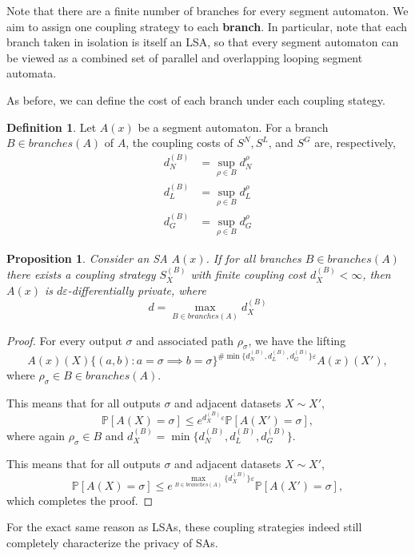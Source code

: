 \documentclass[12pt]{article}
\newcommand{\PP}{\mathbb{P}}
\newtheorem{prop}[thm]{Proposition}
\theoremstyle{definition}
\newtheorem{defn}[thm]{Definition}
\begin{document}
Note that there are a finite number of branches for every segment automaton. We aim to assign one coupling strategy to each \textbf{branch}. In particular, note that each branch taken in isolation is itself an LSA, so that every segment automaton can be viewed as a combined set of parallel and overlapping looping segment automata. 

As before, we can define the cost of each branch under each coupling stategy.

\begin{defn}
    Let $A(x)$ be a segment automaton. For a branch $B\in branches(A)$ of $A$, the coupling costs of $S^N, S^L$, and $S^G$ are, respectively,
    \begin{align*}
        d_N^{(B)} &= \sup_{\rho\in B} d_N^\rho\\
        d_L^{(B)} &= \sup_{\rho\in B} d_L^\rho\\
        d_G^{(B)} &= \sup_{\rho\in B} d_G^\rho
    \end{align*}
\end{defn}


\begin{prop}
    Consider an SA $A(x)$. If for all branches $B\in branches(A)$ there exists a coupling strategy $S_X^{(B)}$ with finite coupling cost $d_X^{(B)} <\infty$, then $A(x)$ is $d\varepsilon$-differentially private, where \[
        d = \max_{B\in branches(A)} d_X^{(B)}   
    \]
\end{prop}
\begin{proof}
    For every output $\sigma$ and associated path $\rho_\sigma$, we have the lifting \[
        A(x)(X)\{(a, b): a = \sigma \implies b=\sigma\}^{\#\min\{d_N^{(B)}, d_L^{(B)}, d_G^{(B)}\}\varepsilon}A(x)(X'),
    \]
    where $\rho_\sigma\in B\in branches(A)$. 

    This means that for all outputs $\sigma$ and adjacent datasets $X\sim X'$,
    \[\PP[A(X) = \sigma] \leq e^{d_X^{(B)}\varepsilon}\PP[A(X')=\sigma],\]
    where again $\rho_\sigma \in B$ and $d_X^{(B)}=\min\{d_N^{(B)}, d_L^{(B)}, d_G^{(B)}\}$.

    This means that for all outputs $\sigma$ and adjacent datasets $X\sim X'$,    
    \[\PP[A(X) = \sigma] \leq e^{\max_{B\in branches(A)}\{d_X^{(B)}\}\varepsilon}\PP[A(X')=\sigma],\]
    which completes the proof.
\end{proof}

For the exact same reason as LSAs, these coupling strategies indeed still completely characterize the privacy of SAs.
\end{document}

